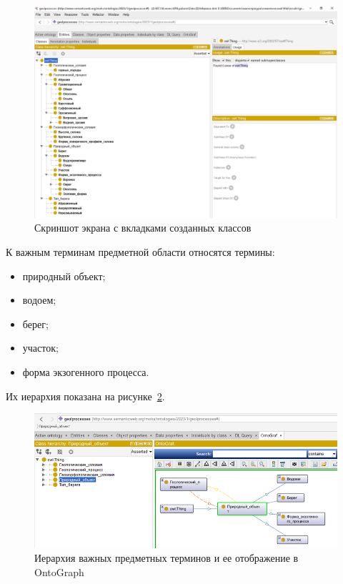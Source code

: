 \documentclass[732,14pt,final]{studrep}
\begin{document}
\begin{center}
  \begin{figure}[htp]
	\centering
	\includegraphics[width=0.9\linewidth]{pics/image16.png}
    \caption{Скриншот экрана с вкладками созданных классов}
    \label{fig:onto-classes}
  \end{figure}
\end{center}

К важным терминам предметной области относятся термины:
\begin{itemize}
\item природный объект;
\item водоем;
\item берег;
\item участок;
\item форма экзогенного процесса.
\end{itemize}
Их иерархия показана на рисунке~\ref{fig:onto-hierarchy}.

\begin{center}
  \begin{figure}[htp]
	\centering
	\includegraphics[width=0.9\linewidth]{pics/image2.png}
    \caption{Иерархия важных предметных терминов и ее отображение в OntoGraph}
    \label{fig:onto-hierarchy}
  \end{figure}
\end{center}
\end{document}
